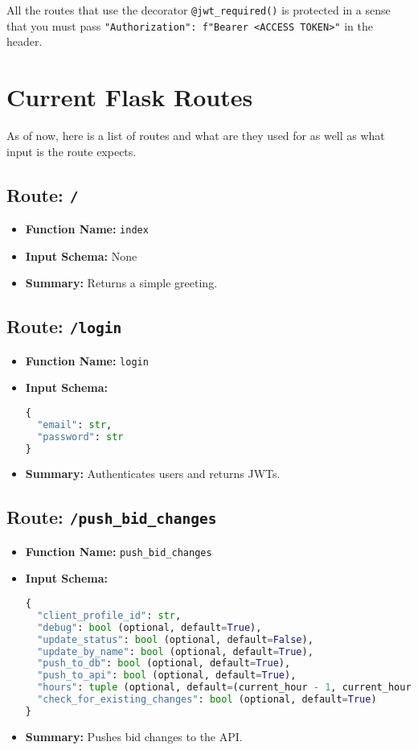 \begin{outline}
  All the routes that use the decorator \verb|@jwt_required()| is protected in a sense that you must pass \verb|"Authorization": f"Bearer <ACCESS TOKEN>"| in the header.
\end{outline}

\section{Current Flask Routes}

As of now, here is a list of routes and what are they used for as well as what input is the route expects.

\subsection{Route: \texttt{/}}
\begin{itemize}
  \item \textbf{Function Name:} \texttt{index}
  \item \textbf{Input Schema:} None
  \item \textbf{Summary:} Returns a simple greeting.
\end{itemize}

\subsection{Route: \texttt{/login}}
\begin{itemize}
  \item \textbf{Function Name:} \texttt{login}
  \item \textbf{Input Schema:}
        \begin{lstlisting}[language=Python]
{
  "email": str,
  "password": str
}
  \end{lstlisting}
  \item \textbf{Summary:} Authenticates users and returns JWTs.
\end{itemize}

\subsection{Route: \texttt{/push\_bid\_changes}}
\begin{itemize}
  \item \textbf{Function Name:} \texttt{push\_bid\_changes}
  \item \textbf{Input Schema:}
        \begin{lstlisting}[language=Python]
{
  "client_profile_id": str,
  "debug": bool (optional, default=True),
  "update_status": bool (optional, default=False),
  "update_by_name": bool (optional, default=True),
  "push_to_db": bool (optional, default=True),
  "push_to_api": bool (optional, default=True),
  "hours": tuple (optional, default=(current_hour - 1, current_hour)),
  "check_for_existing_changes": bool (optional, default=True)
}
  \end{lstlisting}
  \item \textbf{Summary:} Pushes bid changes to the API.
\end{itemize}

